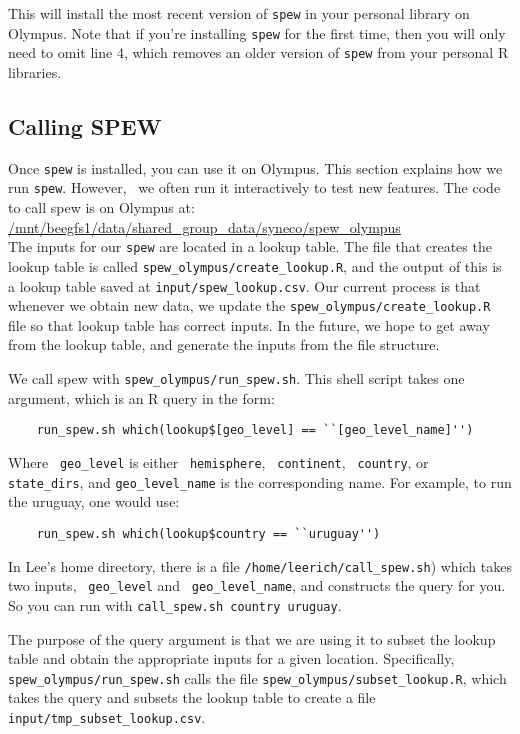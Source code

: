 \documentclass{article}
\begin{document}
This will install the most recent version of \verb|spew| in your personal library on Olympus. Note that if you're installing \verb|spew| for the first time, then you will only need to omit line 4, which removes an older version of \verb|spew| from your personal R libraries. 

\subsection{Calling SPEW} 
Once \verb|spew| is installed, you can use it on Olympus. This section explains how we run \verb|spew|. However, \
we often run it interactively to test new features. The code to call spew is on Olympus at: \\

\url{/mnt/beegfs1/data/shared_group_data/syneco/spew_olympus} \\

The inputs for our \verb|spew| are located in a lookup table. The file that creates the lookup table is called \verb|spew_olympus/create_lookup.R|, and the output of this is a lookup table saved at \verb|input/spew_lookup.csv|. Our current process is that whenever we obtain new data, we update the \verb|spew_olympus/create_lookup.R| file so that lookup table has correct inputs. In the future, we hope to get away from the lookup table, and generate the inputs from the file structure. 

We call spew with \verb|spew_olympus/run_spew.sh|. This shell script takes one argument, which is an R query in the form:

\begin{verbatim} 
	run_spew.sh which(lookup$[geo_level] == ``[geo_level_name]'')
\end{verbatim}

Where \verb| geo_level| is either \verb| hemisphere|, \verb| continent|, \verb| country|, or \verb| state_dirs|, and \verb|geo_level_name| is the corresponding name. For example, to run the uruguay, one would use:

\begin{verbatim} 
	run_spew.sh which(lookup$country == ``uruguay'')
\end{verbatim}

In Lee's home directory, there is a file \verb|/home/leerich/call_spew.sh|) which takes two inputs, \verb| geo_level| and \verb| geo_level_name|, and constructs the query for you. So you can run with \verb|call_spew.sh country uruguay|. 

The purpose of the query argument is that we are using it to subset the lookup table and obtain the appropriate inputs for a given location. Specifically, \verb|spew_olympus/run_spew.sh| calls the file \verb|spew_olympus/subset_lookup.R|, which takes the query and subsets the lookup table to create a file \verb|input/tmp_subset_lookup.csv|. 
\end{document}
